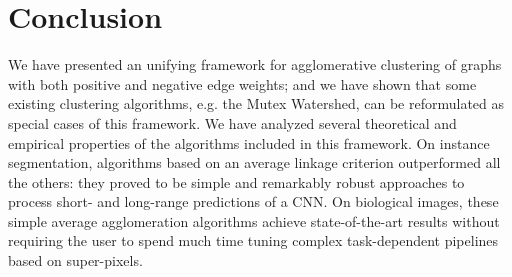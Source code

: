 \section{Conclusion}
We have presented an unifying framework for agglomerative clustering of graphs with both positive and negative edge weights; and we have shown that some existing clustering algorithms, e.g. the Mutex Watershed, can be reformulated as special cases of this framework. 
We have analyzed several theoretical and empirical properties of the algorithms included in this framework. On instance segmentation, algorithms based on an average linkage criterion outperformed all the others: they proved to be simple and remarkably robust approaches to process short- and long-range predictions of a CNN.
On biological images, these simple average agglomeration algorithms achieve state-of-the-art results without requiring the user to spend much time tuning complex task-dependent pipelines based on super-pixels.
